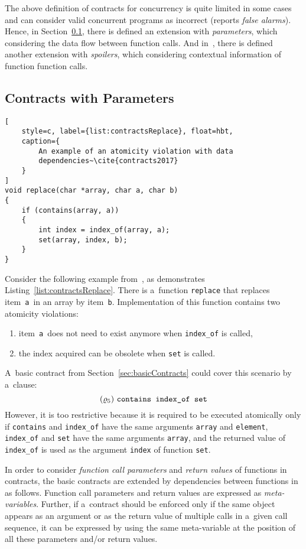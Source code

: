 The above definition of contracts for concurrency is quite limited in
some cases and can consider valid concurrent programs as incorrect (reports
\emph{false alarms}). Hence, in Section~\ref{sec:parameterContracts},
there is defined an extension with \emph{parameters}, which considering the
data flow between function calls. And in~\cite{contracts2017}, there
is defined another extension with \emph{spoilers}, which considering
contextual information of function function calls.


\subsection{Contracts with Parameters}
\label{sec:parameterContracts}

\begin{lstlisting}[
    style=c, label={list:contractsReplace}, float=hbt,
    caption={
        An example of an atomicity violation with data
        dependencies~\cite{contracts2017}
    }
]
void replace(char *array, char a, char b)
{
    if (contains(array, a))
    {
        int index = index_of(array, a);
        set(array, index, b);
    }
}
\end{lstlisting}

Consider the following example from~\cite{contracts2017}, as demonstrates
Listing~\ref{list:contractsReplace}. There is a~function \texttt{replace}
that replaces item~\texttt{a}~in an array by item~\texttt{b}. Implementation
of this function contains two atomicity violations:
\begin{enumerate}[label={(\roman*)}]
    \item
        item~\texttt{a}~does not need to exist anymore when \texttt{index\_of}
        is called,

    \item
        the index acquired can be obsolete when \texttt{set} is called.
\end{enumerate}
A~basic contract from Section~\ref{sec:basicContracts} could cover
this scenario by a~clause:
$$ (\varrho_5)\ \text{\texttt{contains index\_of set}} $$
However, it is too restrictive because it is required to be executed
atomically only if \texttt{contains} and \texttt{index\_of} have the same
arguments \texttt{array} and \texttt{element}, \texttt{index\_of} and
\texttt{set} have the same arguments \texttt{array}, and the returned value of
\texttt{index\_of} is used as the argument \texttt{index} of function
\texttt{set}.

In order to consider \emph{function call parameters} and \emph{return values}
of functions in contracts, the basic contracts are extended by dependencies
between functions in~\cite{contracts2017} as follows. Function call parameters
and return values are expressed as \emph{meta-variables}. Further, if a~contract
should be enforced only if the same object appears as an argument or as
the return value of multiple calls in a~given call sequence, it can be expressed
by using the same meta-variable at the position of all these parameters
and/or return values.

